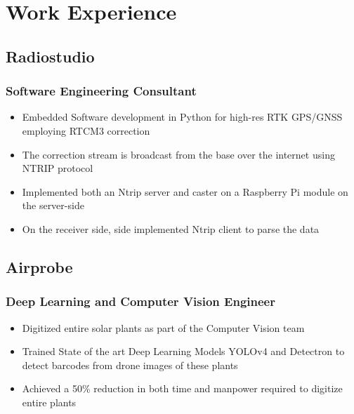\documentclass{article}
\begin{document}
\vspace{1em}




\section{Work Experience}

\subsection{Radiostudio \null\hfill{}}
\subsubsection{Software Engineering Consultant}
\begin{itemize}[leftmargin=1em]

	\setlength\itemsep{-0.4em}
	\normalfont

	\item Embedded Software development in Python for high-res RTK GPS/GNSS employing RTCM3 correction
	\item The correction stream is broadcast from the base over the internet using NTRIP protocol
	\item Implemented both an Ntrip server and caster on a Raspberry Pi module on the server-side
	\item On the receiver side, side implemented Ntrip client to parse the data

\end{itemize}


\subsection{Airprobe \null\hfill{}}
\subsubsection{Deep Learning and Computer Vision Engineer}
\begin{itemize}[leftmargin=1em]

	\setlength\itemsep{-0.4em}
	\normalfont

	\item Digitized entire solar plants as part of the Computer Vision team
	\item Trained State of the art Deep Learning Models YOLOv4 and Detectron to detect barcodes from drone images of these plants
	\item Achieved a 50\% reduction in both time and manpower required to digitize entire plants

\end{itemize}
\end{document}
